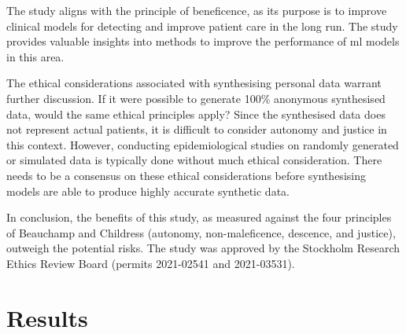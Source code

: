 \documentclass[12pt, letterpaper]{article}
\begin{document}
The study aligns with the principle of beneficence, as its purpose is to improve clinical models for detecting  and improve patient care in the long run. The study provides valuable insights into methods to improve the performance of \acrshort{ml} models in this area.

The ethical considerations associated with synthesising personal data warrant further discussion. If it were possible to generate 100\% anonymous synthesised data, would the same ethical principles apply? Since the synthesised data does not represent actual patients, it is difficult to consider autonomy and justice in this context. However, conducting epidemiological studies on randomly generated or simulated data is typically done without much ethical consideration. There needs to be a consensus on these ethical considerations before synthesising models are able to produce highly accurate synthetic data.

In conclusion, the benefits of this study, as measured against the four principles of Beauchamp and Childress (autonomy, non-maleficence, descence, and justice), outweigh the potential risks. The study was approved by the Stockholm Research Ethics Review Board (permits 2021-02541 and 2021-03531).

\section{Results}
\end{document}
